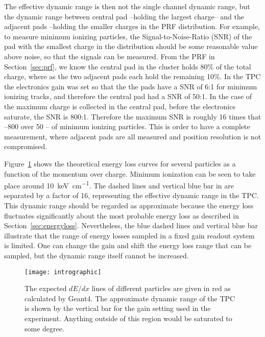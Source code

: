 The effective dynamic range is then not the single channel dynamic range, but the dynamic range between central pad --holding the largest charge-- and the adjacent pads --holding the smaller charges in the PRF distribution. For example, to measure minimum ionizing particles, the Signal-to-Noise-Ratio (SNR) of the pad with the smallest charge in the distribution should be some reasonable value above noise, so that the signals can be measured. From the PRF in Section~\ref{sec:prf}, we know the central pad in the cluster holds 80\% of the total charge, where as the two adjacent pads each hold the remaining 10\%. In the \spirit TPC the electronics gain was set so that the the pads have a SNR of 6:1 for minimum ionizing tracks, and therefore the central pad had a SNR of 50:1. In the case of the maximum charge is collected in the central pad, before the electronics saturate, the SNR is 800:1. Therefore the maximum SNR is roughly 16 times that  --800 over 50 -- of minimum ionizing particles. This is order to have a complete measurement, where adjacent pads are all measured and position resolution is not compromised. 

Figure~\ref{fig:intro} shows the theoretical energy loss curves for several particles as a function of the momentum over charge. Minimum ionization can be seen to take place around \SI{10}{\kilo\electronvolt\per\centi\metre}. The dashed lines and vertical blue bar in are separated by a factor of 16, representing the effective dynamic range in the \spirit TPC. This dynamic range should be regarded as approximate because the energy loss fluctuates significantly about the most probable energy loss as described in Section~\ref{sec:energyloss}. Nevertheless, the blue dashed lines and vertical blue bar illustrate that the range of energy losses sampled in a fixed gain readout system is limited. One can change the gain and shift the energy loss range that can be sampled, but the dynamic range itself cannot be increased.

  
\begin{figure}[ht!]
\texttt{[image: intrographic]}
\caption{The expected $dE/dx$ lines of different particles are given in red as calculated by Geant4. The approximate dynamic range of the TPC is shown by the vertical bar for the gain setting used in the experiment. Anything outside of this region would be saturated to some degree.}
\label{fig:intro}
\end{figure}



